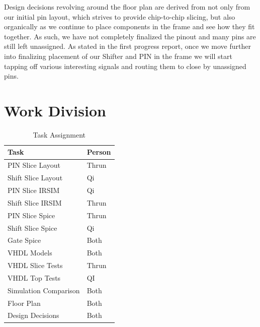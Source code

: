Design decisions revolving around the floor plan are derived from not only from
our initial pin layout, which strives to provide chip-to-chip slicing, but also
organically as we continue to place components in the frame and see how they
fit together. As such, we have not completely finalized the pinout and many
pins are still left unassigned. As stated in the first progress report, once we
move further into finalizing placement of our Shifter and PIN in the frame we
will start tapping off various interesting signals and routing them to close by
unassigned pins.


\section{Work Division}
\vspace{2\baselineskip}

\begin{table}[H]
    \centering
    \begin{tabular}{ll}
        \toprule
        \textbf{Task} & \textbf{Person}\\
        \midrule
        PIN Slice Layout      & Thrun \\
        Shift Slice Layout    & Qi \\
        PIN Slice IRSIM       & Qi \\
        Shift Slice IRSIM     & Thrun \\
        PIN Slice Spice       & Thrun \\
        Shift Slice Spice     & Qi \\
        Gate Spice            & Both \\
        VHDL Models           & Both \\
        VHDL Slice Tests      & Thrun \\
        VHDL Top Tests        & QI \\
        Simulation Comparison & Both \\
        Floor Plan            & Both \\
        Design Decisions      & Both \\
        \bottomrule
    \end{tabular}
    \caption{Task Assignment}
\end{table}

